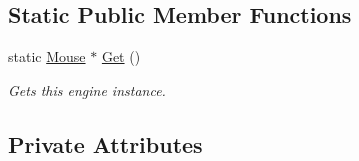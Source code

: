 \subsection*{Static Public Member Functions}
\begin{DoxyCompactItemize}
\item 
static \hyperlink{class_flounder_1_1_mouse}{Mouse} $\ast$ \hyperlink{class_flounder_1_1_mouse_a7a3bad91ffda3a5c1eb0ce2408225f7d}{Get} ()
\begin{DoxyCompactList}\small\item\em Gets this engine instance. \end{DoxyCompactList}\end{DoxyCompactItemize}
\subsection*{Private Attributes}
